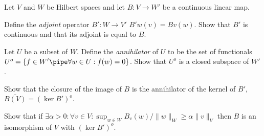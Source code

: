 Let $V$ and $W$ be Hilbert spaces and let $B:V\rightarrow W'$ be a
continuous linear map.
\begin{alist}
\item Define the \emph{adjoint} operator $B':W\rightarrow V'$ 
$B'w(v)=Bv(w)$. Show that $B'$ is continuous and that its adjoint is
equal to $B$.
\item Let $U$ be a subset of $W$. Define the \emph{annihilator} of
$U$ to be the set of functionals $U^o=\{f\in W'\pipe \forall w\in
U:f(w)=0\}$. Show that $U^o$ is a closed subspace of $W'$.
\item Show that the closure of the image of $B$ is the annihilator
of the kernel of $B'$, \ie\ $\overline{B(V)}=(\ker B')^o$.
\item Show that if $\exists \alpha>0:\forall v\in V: \sup_{w\in W}
B_v(w)/\|w\|_W \geq \alpha \|v\|_V$ then $B$ is an isomorphism of $V$
with $(\ker B')^o$.
\end{alist}
